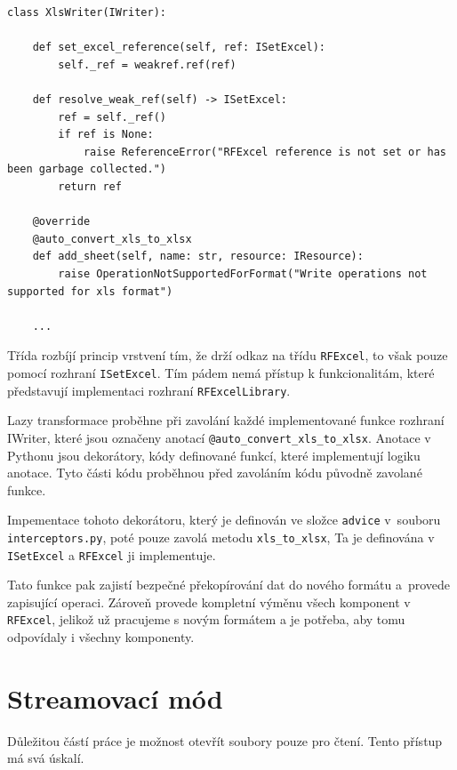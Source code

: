 \begin{listing}[H]
    \begin{verbatim}
class XlsWriter(IWriter):

    def set_excel_reference(self, ref: ISetExcel):
        self._ref = weakref.ref(ref)

    def resolve_weak_ref(self) -> ISetExcel:
        ref = self._ref()
        if ref is None:
            raise ReferenceError("RFExcel reference is not set or has been garbage collected.")
        return ref

    @override
    @auto_convert_xls_to_xlsx
    def add_sheet(self, name: str, resource: IResource):
        raise OperationNotSupportedForFormat("Write operations not supported for xls format")

    ...
    \end{verbatim}
    
    \caption{Implementace lazy transformace - vlastní tvorba}
    \label{list:demo-library}
\end{listing}

Třída rozbíjí princip  vrstvení tím, že drží odkaz na třídu \texttt{RFExcel}, to však pouze pomocí rozhraní \texttt{ISetExcel}. Tím pádem nemá přístup k funkcionalitám, které představují implementaci rozhraní \texttt{RFExcelLibrary}.

Lazy transformace proběhne při zavolání každé implementované funkce rozhraní IWriter, které jsou označeny anotací \texttt{@auto\_convert\_xls\_to\_xlsx}. Anotace v Pythonu jsou dekorátory, kódy definované funkcí, které implementují logiku anotace. Tyto části kódu proběhnou před zavoláním kódu původně zavolané funkce.

Impementace tohoto dekorátoru, který je definován ve složce \texttt{advice} v~souboru \texttt{interceptors.py}, poté pouze zavolá metodu \texttt{xls\_to\_xlsx}, Ta je definována v \texttt{ISetExcel} a \texttt{RFExcel} ji implementuje.

Tato funkce pak zajistí bezpečné překopírování dat do nového formátu a~provede zapisující operaci. Zároveň provede kompletní výměnu všech komponent v \texttt{RFExcel}, jelikož už pracujeme s novým formátem a je potřeba, aby tomu odpovídaly i všechny komponenty.

\section{Streamovací mód}

Důležitou částí práce je možnost otevřít soubory pouze pro čtení. Tento přístup má svá úskalí.

